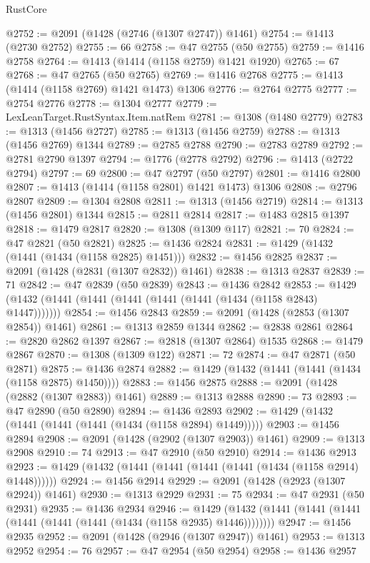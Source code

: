 \begin{lexlean}{RustCore}
\begin{coremodule}
@2752 := @2091 (@1428 (@2746 (@1307 @2747)) @1461)
@2754 := @1413 (@2730 @2752)
@2755 := 66
@2758 := @47 @2755 (@50 @2755)
@2759 := @1416 @2758
@2764 := @1413 (@1414 (@1158 @2759) @1421 @1920)
@2765 := 67
@2768 := @47 @2765 (@50 @2765)
@2769 := @1416 @2768
@2775 := @1413 (@1414 (@1158 @2769) @1421 @1473) @1306
@2776 := @2764 @2775
@2777 := @2754 @2776
@2778 := @1304 @2777
@2779 := LexLeanTarget.RustSyntax.Item.natRem
@2781 := @1308 (@1480 @2779)
@2783 := @1313 (@1456 @2727)
@2785 := @1313 (@1456 @2759)
@2788 := @1313 (@1456 @2769) @1344
@2789 := @2785 @2788
@2790 := @2783 @2789
@2792 := @2781 @2790 @1397
@2794 := @1776 (@2778 @2792)
@2796 := @1413 (@2722 @2794)
@2797 := 69
@2800 := @47 @2797 (@50 @2797)
@2801 := @1416 @2800
@2807 := @1413 (@1414 (@1158 @2801) @1421 @1473) @1306
@2808 := @2796 @2807
@2809 := @1304 @2808
@2811 := @1313 (@1456 @2719)
@2814 := @1313 (@1456 @2801) @1344
@2815 := @2811 @2814
@2817 := @1483 @2815 @1397
@2818 := @1479 @2817
@2820 := @1308 (@1309 @117)
@2821 := 70
@2824 := @47 @2821 (@50 @2821)
@2825 := @1436 @2824
@2831 := @1429 (@1432 (@1441 (@1434 (@1158 @2825) @1451)))
@2832 := @1456 @2825
@2837 := @2091 (@1428 (@2831 (@1307 @2832)) @1461)
@2838 := @1313 @2837
@2839 := 71
@2842 := @47 @2839 (@50 @2839)
@2843 := @1436 @2842
@2853 := @1429 (@1432 (@1441 (@1441 (@1441 (@1441 (@1441 (@1434 (@1158 @2843) @1447)))))))
@2854 := @1456 @2843
@2859 := @2091 (@1428 (@2853 (@1307 @2854)) @1461)
@2861 := @1313 @2859 @1344
@2862 := @2838 @2861
@2864 := @2820 @2862 @1397
@2867 := @2818 (@1307 @2864) @1535
@2868 := @1479 @2867
@2870 := @1308 (@1309 @122)
@2871 := 72
@2874 := @47 @2871 (@50 @2871)
@2875 := @1436 @2874
@2882 := @1429 (@1432 (@1441 (@1441 (@1434 (@1158 @2875) @1450))))
@2883 := @1456 @2875
@2888 := @2091 (@1428 (@2882 (@1307 @2883)) @1461)
@2889 := @1313 @2888
@2890 := 73
@2893 := @47 @2890 (@50 @2890)
@2894 := @1436 @2893
@2902 := @1429 (@1432 (@1441 (@1441 (@1441 (@1434 (@1158 @2894) @1449)))))
@2903 := @1456 @2894
@2908 := @2091 (@1428 (@2902 (@1307 @2903)) @1461)
@2909 := @1313 @2908
@2910 := 74
@2913 := @47 @2910 (@50 @2910)
@2914 := @1436 @2913
@2923 := @1429 (@1432 (@1441 (@1441 (@1441 (@1441 (@1434 (@1158 @2914) @1448))))))
@2924 := @1456 @2914
@2929 := @2091 (@1428 (@2923 (@1307 @2924)) @1461)
@2930 := @1313 @2929
@2931 := 75
@2934 := @47 @2931 (@50 @2931)
@2935 := @1436 @2934
@2946 := @1429 (@1432 (@1441 (@1441 (@1441 (@1441 (@1441 (@1441 (@1434 (@1158 @2935) @1446))))))))
@2947 := @1456 @2935
@2952 := @2091 (@1428 (@2946 (@1307 @2947)) @1461)
@2953 := @1313 @2952
@2954 := 76
@2957 := @47 @2954 (@50 @2954)
@2958 := @1436 @2957

\end{coremodule}
\end{lexlean}
